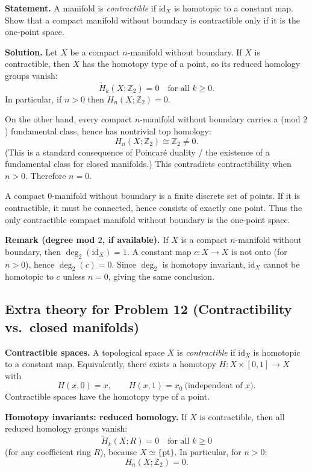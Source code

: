 \documentclass[12pt,a4paper]{article}
\theoremstyle{plain}
\theoremstyle{definition}      %
\begin{document}
\textbf{Statement.} A manifold is \emph{contractible} if $\mathrm{id}_X$ is homotopic to a constant map.
Show that a compact manifold without boundary is contractible only if it is the one-point space.

\medskip
\noindent\textbf{Solution.}
Let $X$ be a compact $n$-manifold without boundary. If $X$ is contractible, then $X$ has the homotopy type of a point,
so its reduced homology groups vanish:
\[
\widetilde H_k(X;\mathbb{Z}_2)=0 \quad \text{for all } k\ge 0.
\]
In particular, if $n>0$ then $H_n(X;\mathbb{Z}_2)=0$.

On the other hand, every compact $n$-manifold without boundary carries a (mod $2$) fundamental class, hence has nontrivial
top homology:
\[
H_n(X;\mathbb{Z}_2)\cong \mathbb{Z}_2 \neq 0.
\]
(This is a standard consequence of Poincar\'e duality / the existence of a fundamental class for closed manifolds.)
This contradicts contractibility when $n>0$. Therefore $n=0$.

A compact $0$-manifold without boundary is a finite discrete set of points. If it is contractible, it must be connected,
hence consists of exactly one point. Thus the only contractible compact manifold without boundary is the one-point space.

\medskip
\noindent\textbf{Remark (degree mod $2$, if available).}
If $X$ is a compact $n$-manifold without boundary, then $\deg_2(\mathrm{id}_X)=1$.
A constant map $c:X\to X$ is not onto (for $n>0$), hence $\deg_2(c)=0$.
Since $\deg_2$ is homotopy invariant, $\mathrm{id}_X$ cannot be homotopic to $c$ unless $n=0$, giving the same conclusion.

\subsection*{Extra theory for Problem 12 (Contractibility vs.\ closed manifolds)}

\noindent\textbf{Contractible spaces.}
A topological space $X$ is \emph{contractible} if $\mathrm{id}_X$ is homotopic to a constant map.
Equivalently, there exists a homotopy $H:X\times[0,1]\to X$ with
\[
H(x,0)=x,\qquad H(x,1)=x_0 \ \text{(independent of $x$)}.
\]
Contractible spaces have the homotopy type of a point.

\medskip
\noindent\textbf{Homotopy invariants: reduced homology.}
If $X$ is contractible, then all reduced homology groups vanish:
\[
\widetilde H_k(X;R)=0 \quad \text{for all } k\ge 0
\]
(for any coefficient ring $R$), because $X\simeq \{\mathrm{pt}\}$.
In particular, for $n>0$:
\[
H_n(X;\mathbb{Z}_2)=0.
\]
\end{document}

